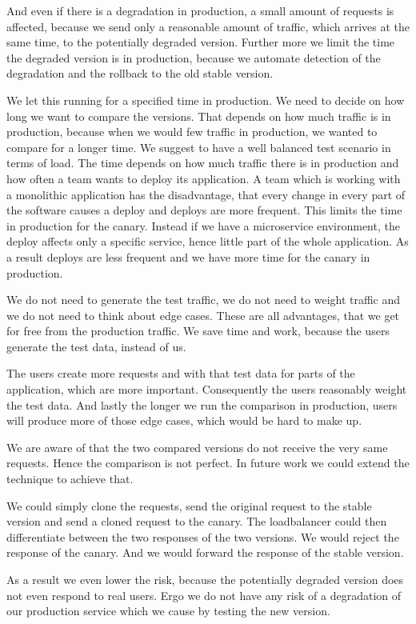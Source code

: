 And even if there is a degradation in production, a small amount of requests is affected,
because we send only a reasonable amount of traffic, which arrives at the same time, to
the potentially degraded version. Further more we limit the time the degraded version is
in production, because we automate detection of the degradation and the rollback to the
old stable version.


We let this running for a specified time in production. We need to decide on how long we
want to compare the versions. That depends on how much traffic is in production, because
when we would few traffic in production, we wanted to compare for a longer time. We
suggest to have a well balanced test scenario in terms of load. The time depends on how
much traffic there is in production and how often a team wants to deploy its
application. A team which is working with a monolithic application has the disadvantage,
that every change in every part of the software causes a deploy and deploys are more
frequent. This limits the time in production for the canary. Instead if we have a
microservice environment, the deploy affects only a specific service, hence little part of
the whole application. As a result deploys are less frequent and we have more time for the
canary in production.

We do not need to generate the test traffic, we do not need to weight traffic and we do
not need to think about edge cases. These are all advantages, that we get for free from
the production traffic. We save time and work, because the users generate the test data,
instead of us.

The users create more requests and with that test data for parts of the application, which
are more important. Consequently the users reasonably weight the test data. And lastly the
longer we run the comparison in production, users will produce more of those edge cases,
which would be hard to make up.

We are aware of that the two compared versions do not receive the very same
requests. Hence the comparison is not perfect. In future work we could extend the
technique to achieve that.

We could simply clone the requests, send the original request to the stable version and
send a cloned request to the canary. The loadbalancer could then differentiate between the
two responses of the two versions. We would reject the response of the canary. And we
would forward the response of the stable version.

As a result we even lower the risk, because the potentially degraded version does not even
respond to real users. Ergo we do not have any risk of a degradation of our production
service which we cause by testing the new version.

